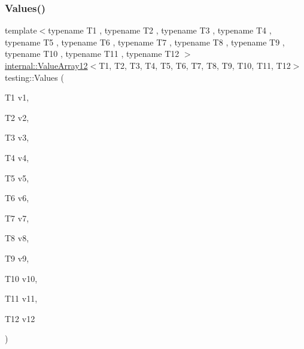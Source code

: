 \subsubsection{\texorpdfstring{Values()}{Values()}\hspace{0.1cm}{\footnotesize\ttfamily [13/51]}}
{\footnotesize\ttfamily template$<$typename T1 , typename T2 , typename T3 , typename T4 , typename T5 , typename T6 , typename T7 , typename T8 , typename T9 , typename T10 , typename T11 , typename T12 $>$ \\
\mbox{\hyperlink{classtesting_1_1internal_1_1_value_array12}{internal\+::\+Value\+Array12}}$<$T1, T2, T3, T4, T5, T6, T7, T8, T9, T10, T11, T12$>$ testing\+::\+Values (\begin{DoxyParamCaption}\item[{T1}]{v1,  }\item[{T2}]{v2,  }\item[{T3}]{v3,  }\item[{T4}]{v4,  }\item[{T5}]{v5,  }\item[{T6}]{v6,  }\item[{T7}]{v7,  }\item[{T8}]{v8,  }\item[{T9}]{v9,  }\item[{T10}]{v10,  }\item[{T11}]{v11,  }\item[{T12}]{v12 }\end{DoxyParamCaption})}

\mbox{\label{namespacetesting_aa13a09e043383c947042ba726d25d47c}} 
